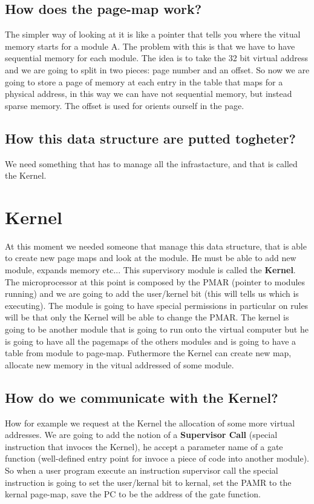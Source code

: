 \documentclass{article}
\begin{document}
    \subsection{How does the page-map work?} The simpler way of looking at it is like a pointer
      that tells you where the vitual memory starts for a module A. The problem with this is
      that we have to have sequential memory for each module. The idea is to take the 32 bit 
      virtual address and we are going to split in two pieces: page number and an offset. So
      now we are going to store a page of memory at each entry in the table that maps 
      for a physical address, in this way we can have not sequential memory, but instead 
      sparse memory. The offset is used for orients ourself in the page.
    \subsection{How this data structure are putted togheter?} We need something that has to 
      manage all the infrastacture, and that is called the Kernel.
  \section{Kernel}
    At this moment we needed someone that manage this data structure, that is able to create 
    new page maps and look at the module. He must be able to add new module, expands memory 
    etc... This supervisory module is called the \textbf{Kernel}. The microprocessor at this 
    point is composed by the PMAR (pointer to modules running) and we are going 
    to add the user/kernel bit (this will tells us which is executing). 
    The module is going to have special permissions in particular on rules will be that 
    only the Kernel will be able to change the PMAR. The kernel is going to be another module
    that is going to run onto the virtual computer but he is going to have all the pagemaps
    of the others modules and is going to have a table from module to page-map. Futhermore the
    Kernel can create new map, allocate new memory in the vitual addressed of some module.
    \subsection{How do we communicate with the Kernel?} How for example we request at the Kernel
      the allocation of some more virtual addresses. We are going to add the notion of a 
      \textbf{Supervisor Call} (special instruction that invoces the Kernel), he accept 
      a parameter name of a gate function (well-defined entry point for invoce a piece of code
      into another module). So when a user program execute an instruction supervisor call the
      special instruction is going to set the user/kernal bit to kernal, set the PAMR to the
      kernal page-map, save the PC to be the address of the gate function. 
\end{document}
